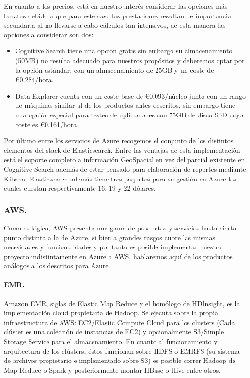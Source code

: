 \documentclass[11pt, a4paper]{article} %
\begin{document}
En cuanto a los precios, está en nuestro interés considerar las opciones más baratas debido a que para este caso las prestaciones resultan de importancia secundaria al no llevarse a cabo cálculos tan intensivos, de esta manera las opciones a considerar son dos: \cite{docazure}
\begin{itemize}
\item Cognitive Search tiene una opción gratis sin embargo su almacenamiento (50MB) no resulta adecuado para nuestros propósitos y deberemos optar por la  opción estándar, con un almacenamiento de 25GB y un coste de €0,284/hora. 
\item Data Explorer cuenta con un coste base de €0.093/núcleo junto con un rango de máquinas similar al de los productos antes descritos, sin embargo tiene una opción especial para testeo de aplicaciones con 75GB de disco SSD cuyo coste es €0.161/hora.
\end{itemize}

Por último entre los servicios de Azure recogemos el conjunto de los distintos elementos del stack de Elasticsearch. Entre las ventajas de esta implementación está el soporte completo a información GeoSpacial en vez del parcial existente en Cognitive Search además de estar pensado para elaboración de reportes mediante Kibana. Elasticsearch además tiene tres paquetes para su gestión en Azure los cuales cuestan respectivamente 16, 19 y 22 dólares.
\subsubsection{AWS.}
Como es lógico, AWS presenta una gama de productos y servicios hasta cierto punto distinta a la de Azure, si bien a grandes rasgos cubre las mismas necesidades y funcionalidades y por tanto es posible implementar nuestro proyecto indistintamente en Azure o AWS, hablaremos aquí de los productos análogos a los descritos para Azure.
\paragraph{EMR.}
Amazon EMR, siglas de Elastic Map Reduce y el homólogo de HDInsight, es la implementación cloud propietaria de Hadoop. Se ejecuta sobre la propia infraestructura de AWS: EC2/Elastic Compute Cloud para los clusters (Cada clúster es una colección de instancias de EC2) y opcionalmente S3/Simple Storage Service para el almacenamiento. En cuanto al funcionamiento y arquitectura de los clústers, éstos funcionan sobre HDFS o EMRFS (su sistema de archivos propietario e implementado sobre S3) es posible correr Hadoop de Map-Reduce o Spark y posteriormente montar HBase o Hive entre otros. \cite{docaws}
\end{document}
